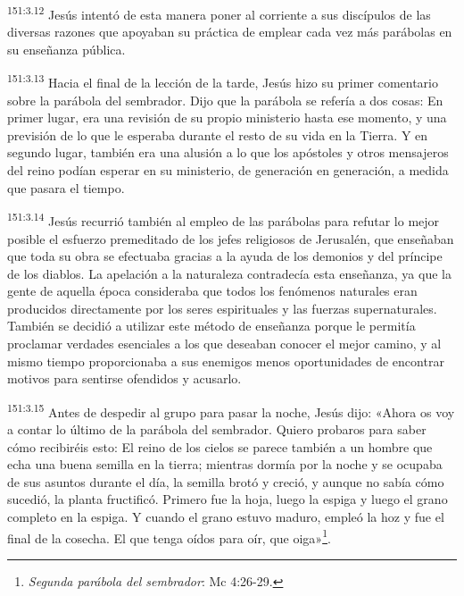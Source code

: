 \par
\textsuperscript{151:3.12} Jesús intentó de esta manera poner al corriente a sus discípulos de las diversas razones que apoyaban su práctica de emplear cada vez más parábolas en su enseñanza pública.

\par
\textsuperscript{151:3.13} Hacia el final de la lección de la tarde, Jesús hizo su primer comentario sobre la parábola del sembrador. Dijo que la parábola se refería a dos cosas: En primer lugar, era una revisión de su propio ministerio hasta ese momento, y una previsión de lo que le esperaba durante el resto de su vida en la Tierra. Y en segundo lugar, también era una alusión a lo que los apóstoles y otros mensajeros del reino podían esperar en su ministerio, de generación en generación, a medida que pasara el tiempo.

\par
\textsuperscript{151:3.14} Jesús recurrió también al empleo de las parábolas para refutar lo mejor posible el esfuerzo premeditado de los jefes religiosos de Jerusalén, que enseñaban que toda su obra se efectuaba gracias a la ayuda de los demonios y del príncipe de los diablos. La apelación a la naturaleza contradecía esta enseñanza, ya que la gente de aquella época consideraba que todos los fenómenos naturales eran producidos directamente por los seres espirituales y las fuerzas supernaturales. También se decidió a utilizar este método de enseñanza porque le permitía proclamar verdades esenciales a los que deseaban conocer el mejor camino, y al mismo tiempo proporcionaba a sus enemigos menos oportunidades de encontrar motivos para sentirse ofendidos y acusarlo.

\par
\textsuperscript{151:3.15} Antes de despedir al grupo para pasar la noche, Jesús dijo: «Ahora os voy a contar lo último de la parábola del sembrador. Quiero probaros para saber cómo recibiréis esto: El reino de los cielos se parece también a un hombre que echa una buena semilla en la tierra; mientras dormía por la noche y se ocupaba de sus asuntos durante el día, la semilla brotó y creció, y aunque no sabía cómo sucedió, la planta fructificó. Primero fue la hoja, luego la espiga y luego el grano completo en la espiga. Y cuando el grano estuvo maduro, empleó la hoz y fue el final de la cosecha. El que tenga oídos para oír, que oiga»\footnote{\textit{Segunda parábola del sembrador}: Mc 4:26-29.}.

